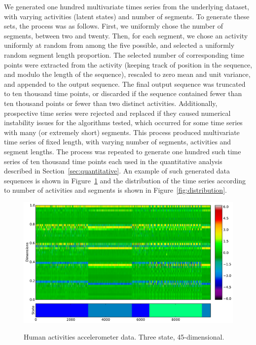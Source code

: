 \documentclass[letterpaper]{article}
\begin{document}
We generated one hundred multivariate times series from the underlying dataset, with varying activities (latent states) and number of segments. To generate these sets, the process was as follows. First, we uniformly chose the number of segments, between two and twenty. Then, for each segment, we chose an activity uniformly at random from among the five possible, and selected a uniformly random segment length proportion. The selected number of corresponding time points were extracted from the activity (keeping track of position in the sequence, and modulo the length of the sequence), rescaled to zero mean and unit variance, and appended to the output sequence. The final output sequence was truncated to ten thousand time points, or discarded if the sequence contained fewer than ten thousand points or fewer than two distinct activities. Additionally, prospective time series were rejected and replaced if they caused numerical instability issues for the algorithms tested, which occurred for some time series with many (or extremely short) segments. This process produced multivariate time series of fixed length, with varying number of segments, activities and segment lengths. The process was repeated to generate one hundred such time series of ten thousand time points each used in the quantitative analysis described in Section~\ref{sec:quantitative}. An example of such generated data sequences is shown in Figure~\ref{fig:accelerometer} and the distribution of the time series according to number of activities and segments is shown in Figure~\ref{fig:distribution}.

\begin{figure}[htbp]
  \caption{Human activities accelerometer data. Three state, 45-dimensional.}
  \centering
    \includegraphics[width=1.\linewidth]{images/accelerometer-data.pdf}
    \label{fig:accelerometer}
\end{figure}
\end{document}
